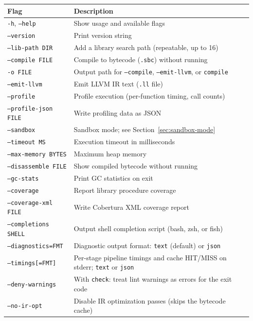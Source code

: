 \begin{center}
\small
\begin{tabularx}{\textwidth}{@{}lY@{}}
\textbf{Flag} & \textbf{Description} \\
\hline
\texttt{-h}, \texttt{--help} & Show usage and available flags \\
\texttt{--version} & Print version string \\
\texttt{--lib-path DIR} & Add a library search path (repeatable, up to 16) \\
\texttt{--compile FILE} & Compile to bytecode (\texttt{.sbc}) without running \\
\texttt{-o FILE} & Output path for \texttt{--compile}, \texttt{--emit-llvm}, or \texttt{compile} \\
\texttt{--emit-llvm} & Emit LLVM IR text (\texttt{.ll} file) \\
\texttt{--profile} & Profile execution (per-function timing, call counts) \\
\texttt{--profile-json FILE} & Write profiling data as JSON \\
\texttt{--sandbox} & Sandbox mode; see Section~\ref{sec:sandbox-mode} \\
\texttt{--timeout MS} & Execution timeout in milliseconds \\
\texttt{--max-memory BYTES} & Maximum heap memory \\
\texttt{--disassemble FILE} & Show compiled bytecode without running \\
\texttt{--gc-stats} & Print GC statistics on exit \\
\texttt{--coverage} & Report library procedure coverage \\
\texttt{--coverage-xml FILE} & Write Cobertura XML coverage report \\
\texttt{--completions SHELL} & Output shell completion script (bash, zsh, or fish) \\
\texttt{--diagnostics=FMT} & Diagnostic output format: \texttt{text} (default) or \texttt{json} \\
\texttt{--timings[=FMT]} & Per-stage pipeline timings and cache HIT/MISS on stderr; \texttt{text} or \texttt{json} \\
\texttt{--deny-warnings} & With \texttt{check}: treat lint warnings as errors for the exit code \\
\texttt{--no-ir-opt} & Disable IR optimization passes (skips the bytecode cache) \\
\end{tabularx}
\end{center}

